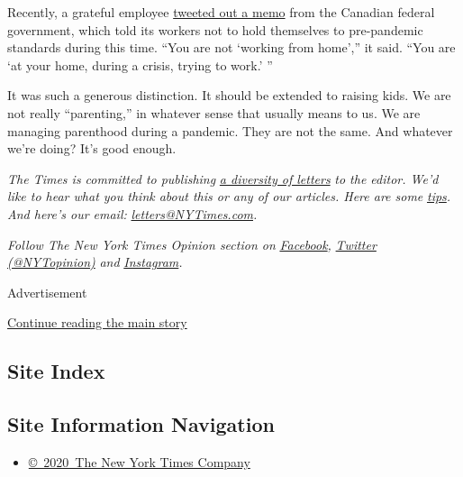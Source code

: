 Recently, a grateful employee
\href{https://twitter.com/slavetothehat/status/1259978637266366465}{tweeted
out a memo} from the Canadian federal government, which told its workers
not to hold themselves to pre-pandemic standards during this time. ``You
are not `working from home','' it said. ``You are `at your home, during
a crisis, trying to work.' ''

It was such a generous distinction. It should be extended to raising
kids. We are not really ``parenting,'' in whatever sense that usually
means to us. We are managing parenthood during a pandemic. They are not
the same. And whatever we're doing? It's good enough.

\emph{The Times is committed to publishing}
\href{https://www.nytimes3xbfgragh.onion/2019/01/31/opinion/letters/letters-to-editor-new-york-times-women.html}{\emph{a
diversity of letters}} \emph{to the editor. We'd like to hear what you
think about this or any of our articles. Here are some}
\href{https://help.nytimes3xbfgragh.onion/hc/en-us/articles/115014925288-How-to-submit-a-letter-to-the-editor}{\emph{tips}}\emph{.
And here's our email:}
\href{mailto:letters@NYTimes.com}{\emph{letters@NYTimes.com}}\emph{.}

\emph{Follow The New York Times Opinion section on}
\href{https://www.facebookcorewwwi.onion/nytopinion}{\emph{Facebook}}\emph{,}
\href{http://twitter.com/NYTOpinion}{\emph{Twitter (@NYTopinion)}}
\emph{and}
\href{https://www.instagram.com/nytopinion/}{\emph{Instagram}}\emph{.}

Advertisement

\protect\hyperlink{after-bottom}{Continue reading the main story}

\hypertarget{site-index}{%
\subsection{Site Index}\label{site-index}}

\hypertarget{site-information-navigation}{%
\subsection{Site Information
Navigation}\label{site-information-navigation}}

\begin{itemize}
\tightlist
\item
  \href{https://help.nytimes3xbfgragh.onion/hc/en-us/articles/115014792127-Copyright-notice}{©~2020~The
  New York Times Company}
\end{itemize}


